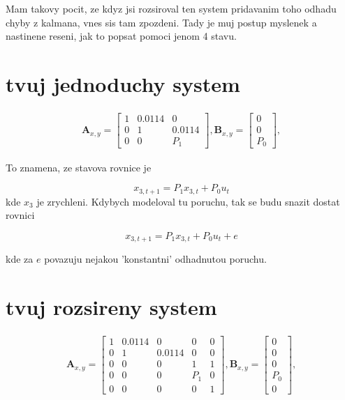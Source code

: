 \documentclass{article}
\begin{document}
Mam takovy pocit, ze kdyz jsi rozsiroval ten system pridavanim toho odhadu chyby z kalmana, vnes sis tam zpozdeni. Tady je muj postup myslenek a nastinene reseni, jak to popsat pomoci jenom 4 stavu. 
\section{tvuj jednoduchy system}

\begin{equation}
\begin{split}
\mathbf{A}_{x, y} = \begin{bmatrix}
1 & 0.0114 & 0\\
0 & 1 & 0.0114\\
0 & 0 & P_1
\end{bmatrix}, \mathbf{B}_{x, y} = \begin{bmatrix}
0\\
0\\
P_0
\end{bmatrix},
\end{split}
\label{eq:attitude_LTI_big_identified}
\end{equation}

To znamena, ze stavova rovnice je 

\begin{equation}
x_{3, t+1} = P_1 x_{3, t}+P_0u_t
\end{equation}
kde $x_{3}$ je zrychleni. Kdybych modeloval tu poruchu, tak se budu snazit dostat rovnici

\begin{equation}
\label{eq:aaa}
x_{3, t+1} = P_1 x_{3, t}+P_0u_t + e
\end{equation}

kde za $e$ povazuju nejakou 'konstantni' odhadnutou poruchu.

\section{tvuj rozsireny system}
\begin{equation}
\begin{split}
\mathbf{A}_{x, y} = \begin{bmatrix}
1 & 0.0114 & 0 & 0 & 0 \\
0 & 1 & 0.0114 & 0 & 0\\
0 & 0 & 0 & 1 & 1 \\
0 & 0 & 0 & P_1 & 0 \\
0 & 0 & 0 & 0 & 1
\end{bmatrix}, \mathbf{B}_{x, y} = \begin{bmatrix}
0\\
0\\
0\\
P_0\\
0
\end{bmatrix},
\end{split}
\label{eq:attitude_LTI_big_identified}
\end{equation}
\end{document}

